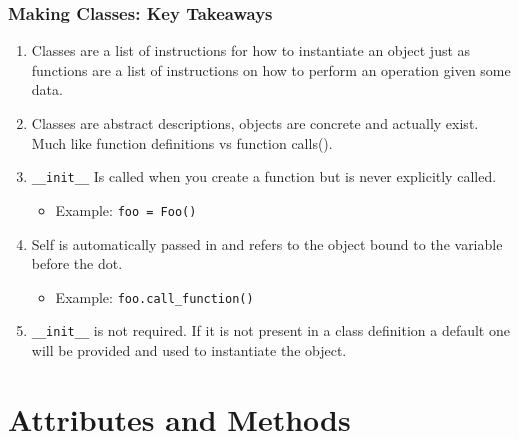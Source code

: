 \documentclass{beamer}
\begin{document}
%
%
\begin{frame}[fragile]
    \frametitle{Making Classes: Key Takeaways}

    \begin{enumerate}
        \item Classes are a list of instructions for how to instantiate an object just as functions are a list of instructions on how to perform an operation given some data.
            \pause
        \item Classes are abstract descriptions, objects are concrete and actually exist. Much like function definitions vs function calls().
            \pause
        \item \lstinline|__init__| Is called when you create a function but is never explicitly called.
            \begin{itemize}
                \item Example: \lstinline|foo = Foo()|
            \end{itemize}
            \pause
        \item Self is automatically passed in and refers to the object bound to the variable before the dot.
            \begin{itemize}
                \item Example: \lstinline|foo.call_function()|
            \end{itemize}
            \pause
        \item \lstinline|__init__| is not required. If it is not present in a class definition a default one will be provided and used to instantiate the object.
    \end{enumerate}

\end{frame}

\section{Attributes and Methods}
\end{document}
